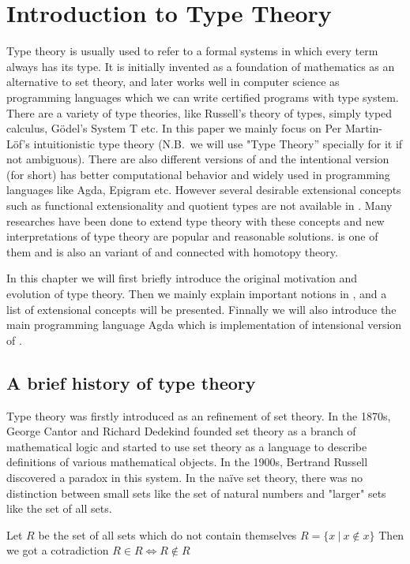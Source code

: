 \chapter{Introduction to Type Theory}
\label{bg}

Type theory is usually used to refer to a formal systems in which every term always has its type. It is initially invented as a foundation of mathematics as an alternative to set theory, and later works well in computer science as programming languages which we can write certified programs with type system. There are a variety of type theories, like Russell's theory of types, simply typed calculus, Gödel's System T \cite{gdl:1931} etc. In this paper we mainly focus on Per Martin-L\"{o}f's intuitionistic type theory (N.B.\ we will use "Type Theory'' specially for it if not ambiguous). There are also different versions of \mltt and the intentional version (\itt for short) has better computational behavior and widely used in programming languages like Agda, Epigram etc. However several desirable extensional concepts such as functional extensionality and quotient types are not available in \itt. Many researches have been done to extend type theory with these concepts and new interpretations of type theory are popular and reasonable solutions. \hott is one of them and is also an variant of \mltt and connected with homotopy theory. 

In this chapter we will first briefly introduce the original motivation and evolution of type theory. Then we mainly explain important notions in \mltt, and a list of extensional concepts will be presented. Finnally we will also introduce the main programming language Agda which is implementation of intensional version of \mltt.


\section{A brief history of type theory}

Type theory was firstly introduced as an refinement of set theory. 
In the 1870s, George Cantor and Richard Dedekind founded set theory as a branch of mathematical logic and started to use set theory as a language to describe definitions of various mathematical objects.
In the 1900s, Bertrand Russell discovered a paradox in this system. In the naïve set theory, there was no distinction between small sets like the set of natural numbers and "larger" sets like the set of all sets.

\begin{example}
Let $R$ be the set of all sets which do not contain themselves
$R = \{x ~| ~x \not\in  x\}$
Then we got a cotradiction
$R \in R \iff R \not\in R$
\end{example}

